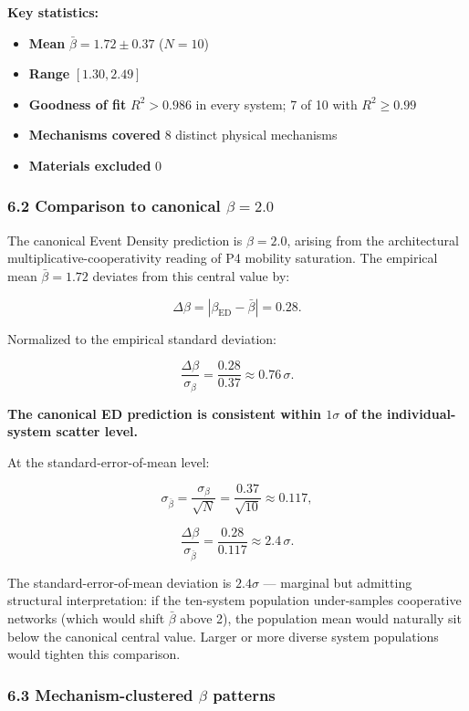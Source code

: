 \documentclass[
  11pt,a4paper]{article}
\providecommand{\tightlist}{%
  \setlength{\itemsep}{0pt}\setlength{\parskip}{0pt}}
\begin{document}
\textbf{Key statistics:}

\begin{itemize}
\tightlist
\item
  \textbf{Mean} \(\bar\beta = 1.72 \pm 0.37\) (\(N = 10\))
\item
  \textbf{Range} \([1.30, 2.49]\)
\item
  \textbf{Goodness of fit} \(R^2 > 0.986\) in every system; 7 of 10 with
  \(R^2 \geq 0.99\)
\item
  \textbf{Mechanisms covered} 8 distinct physical mechanisms
\item
  \textbf{Materials excluded} 0
\end{itemize}

\subsubsection{\texorpdfstring{6.2 Comparison to canonical
\(\beta = 2.0\)}{6.2 Comparison to canonical \textbackslash beta = 2.0}}\label{comparison-to-canonical-beta-2.0}

The canonical Event Density prediction is \(\beta = 2.0\), arising from
the architectural multiplicative-cooperativity reading of P4 mobility
saturation. The empirical mean \(\bar\beta = 1.72\) deviates from this
central value by:

\[\Delta \beta = |\beta_\mathrm{ED} - \bar\beta| = 0.28.\]

Normalized to the empirical standard deviation:

\[\frac{\Delta \beta}{\sigma_\beta} = \frac{0.28}{0.37} \approx 0.76 \, \sigma.\]

\textbf{The canonical ED prediction is consistent within \(1\sigma\) of
the individual-system scatter level.}

At the standard-error-of-mean level:

\[\sigma_{\bar\beta} = \frac{\sigma_\beta}{\sqrt{N}} = \frac{0.37}{\sqrt{10}} \approx 0.117,\]

\[\frac{\Delta \beta}{\sigma_{\bar\beta}} = \frac{0.28}{0.117} \approx 2.4 \, \sigma.\]

The standard-error-of-mean deviation is \(2.4\sigma\) --- marginal but
admitting structural interpretation: if the ten-system population
under-samples cooperative networks (which would shift \(\bar\beta\)
above 2), the population mean would naturally sit below the canonical
central value. Larger or more diverse system populations would tighten
this comparison.

\subsubsection{\texorpdfstring{6.3 Mechanism-clustered \(\beta\)
patterns}{6.3 Mechanism-clustered \textbackslash beta patterns}}\label{mechanism-clustered-beta-patterns}
\end{document}
